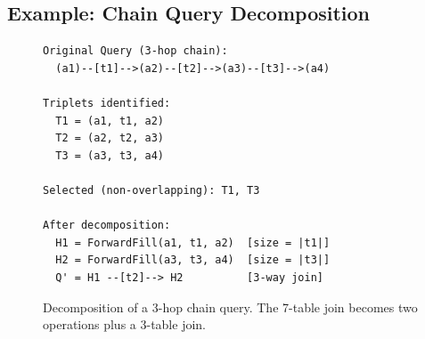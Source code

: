 




\subsection{Example: Chain Query Decomposition}
\label{sec:decomposition:example}

\begin{figure}[t]
\centering
\small
\begin{verbatim}
Original Query (3-hop chain):
  (a1)--[t1]-->(a2)--[t2]-->(a3)--[t3]-->(a4)

Triplets identified:
  T1 = (a1, t1, a2)  
  T2 = (a2, t2, a3)  
  T3 = (a3, t3, a4) 

Selected (non-overlapping): T1, T3

After decomposition:
  H1 = ForwardFill(a1, t1, a2)  [size = |t1|]
  H2 = ForwardFill(a3, t3, a4)  [size = |t3|]
  Q' = H1 --[t2]--> H2          [3-way join]
\end{verbatim}
\caption{Decomposition of a 3-hop chain query. The 7-table join becomes two \onehop operations plus a 3-table join.}
\label{fig:decomposition}
\end{figure}

